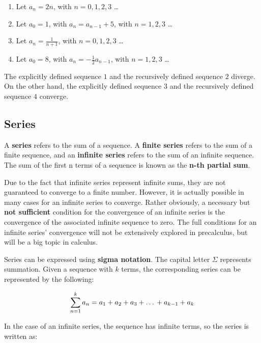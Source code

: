 \documentclass[11pt]{article}
\begin{document}
\begin{center}
    \begin{enumerate}
        \item Let $a_n = 2n$, with $n = 0, 1, 2, 3$ \dots 
        \item Let $a_0 = 1$, with $a_n = a_{n-1}+5$, with $n = 1, 2, 3$ \dots 
        \item Let $a_n = \frac{1}{n+1}$, with $n = 0, 1, 2, 3$ \dots
        \item Let $a_0 = 8$, with $a_n = -\frac{1}{2}a_{n-1}$, with $n = 1, 2, 3$ \dots
    \end{enumerate}
\end{center}

The explicitly defined sequence $1$ and the recursively defined sequence $2$ diverge. On the other hand, the explicitly defined sequence $3$ and the recursively defined sequence $4$ converge.


\subsection{Series}

A \textbf{series} refers to the sum of a sequence. A \textbf{finite series} refers to the sum of a finite sequence, and an \textbf{infinite series} refers to the sum of an infinite sequence. The sum of the first n terms of a sequence is known as the \textbf{n-th partial sum}. 

Due to the fact that infinite series represent infinite sums, they are not guaranteed to converge to a finite number. However, it is actually possible in many cases for an infinite series to converge. Rather obviously, a necessary but \textbf{not sufficient} condition for the convergence of an infinite series is the convergence of the associated infinite sequence to zero. The full conditions for an infinite series' convergence will not be extensively explored in precalculus, but will be a big topic in calculus. 

Series can be expressed using \textbf{sigma notation}. The capital letter $\Sigma$ represents summation. Given a sequence with $k$ terms, the corresponding series can be represented by the following:

\[ \sum_{n=1}^{k} a_n = a_1 + a_2 + a_3 + \text{\dots} + a_{k-1} + a_k \]

In the case of an infinite series, the sequence has infinite terms, so the series is written as: 
\end{document}

